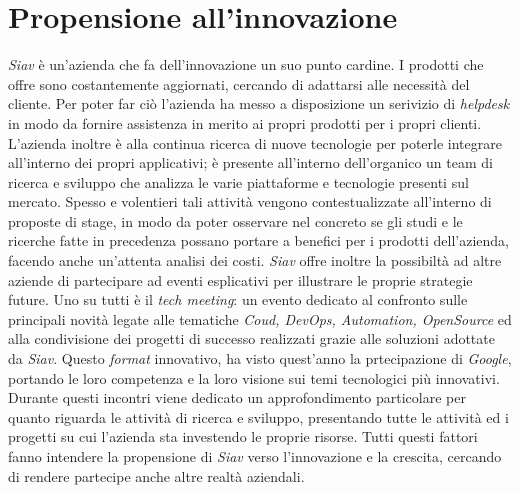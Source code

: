 \section{Propensione all'innovazione}
\textit{Siav} è un'azienda che fa dell'innovazione un suo punto cardine. I prodotti che offre sono costantemente aggiornati, cercando di adattarsi alle necessità del cliente. Per poter far ciò l'azienda ha messo a disposizione un serivizio di \textit{\gls{helpdesk}} in modo da fornire assistenza in merito ai propri prodotti per i propri clienti. L'azienda inoltre è alla continua ricerca di nuove tecnologie per poterle integrare all'interno dei propri applicativi; è presente all'interno dell'organico un team di ricerca e sviluppo che analizza le varie piattaforme e tecnologie presenti sul mercato. Spesso e volentieri tali attività vengono contestualizzate all'interno di proposte di stage, in modo da poter osservare nel concreto se gli studi e le ricerche fatte in precedenza possano portare a benefici per i prodotti dell'azienda, facendo anche un'attenta analisi dei costi. \textit{Siav} offre inoltre la possibiltà ad altre aziende di partecipare ad eventi esplicativi per illustrare le proprie strategie future. Uno su tutti è il \textit{tech meeting}: un evento dedicato al confronto sulle principali novità legate alle tematiche \textit{Coud, DevOps, Automation, OpenSource} ed alla condivisione dei progetti di successo realizzati grazie alle soluzioni adottate da \textit{Siav}. Questo \textit{format} innovativo, ha visto quest'anno la prtecipazione di \textit{Google}, portando le loro competenza e la loro visione sui temi tecnologici più innovativi. Durante questi incontri viene dedicato un approfondimento particolare per quanto riguarda le attività di ricerca e sviluppo, presentando tutte le attività ed i progetti su cui l'azienda sta investendo le proprie risorse. Tutti questi fattori fanno intendere la propensione di \textit{Siav} verso l'innovazione e la crescita, cercando di rendere partecipe anche altre realtà aziendali.  